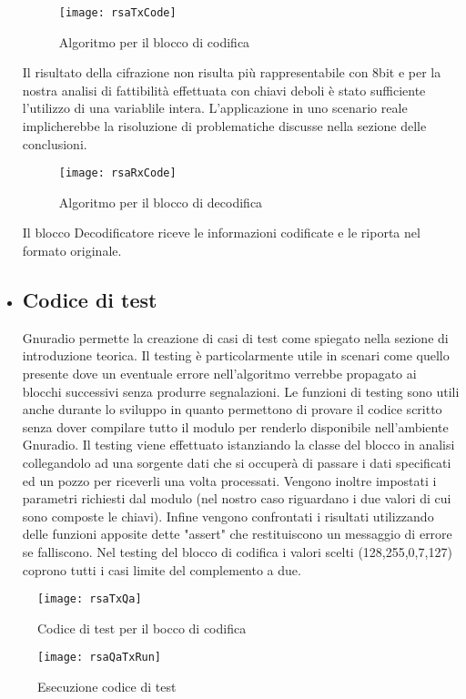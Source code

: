 \begin{itemize}
\begin{figure}[h]
	\texttt{[image: rsaTxCode]}
	\caption{Algoritmo per il blocco di codifica}
\end{figure}
Il risultato della cifrazione non risulta più rappresentabile con 8bit e per la nostra analisi di fattibilità effettuata con chiavi deboli è stato sufficiente l'utilizzo di una variablile intera. L'applicazione in uno scenario reale implicherebbe la risoluzione di problematiche discusse nella sezione delle conclusioni.
\begin{figure}[h]
	\raggedleft
	\texttt{[image: rsaRxCode]}
	\caption{Algoritmo per il blocco di decodifica}
\end{figure}
Il blocco Decodificatore riceve le informazioni codificate e le riporta nel formato originale.
\item \subsection{Codice di test}
Gnuradio permette la creazione di casi di test come spiegato nella sezione di introduzione teorica. Il testing è particolarmente utile in scenari come quello presente dove un eventuale errore nell'algoritmo verrebbe propagato ai blocchi successivi senza produrre segnalazioni. Le funzioni di testing sono utili anche durante lo sviluppo in quanto permettono di provare il codice scritto senza dover compilare tutto il modulo per renderlo disponibile nell'ambiente Gnuradio. Il testing viene effettuato istanziando la classe del blocco in analisi collegandolo ad una sorgente dati che si occuperà di passare i dati specificati ed un pozzo per riceverli una volta processati. Vengono inoltre impostati i parametri richiesti dal modulo (nel nostro caso riguardano i due valori di cui sono composte le chiavi). Infine vengono confrontati i risultati utilizzando delle funzioni apposite dette "assert" che restituiscono un messaggio di errore se falliscono.
Nel testing del blocco di codifica i valori scelti (128,255,0,7,127) coprono tutti i casi limite del complemento a due.
\end{itemize}
\begin{figure}[h]
	\centering
	\texttt{[image: rsaTxQa]}
	\caption{Codice di test per il bocco di codifica}
\end{figure}
\begin{figure}[h]
	\centering
	\texttt{[image: rsaQaTxRun]}
	\caption{Esecuzione codice di test}
\end{figure}
